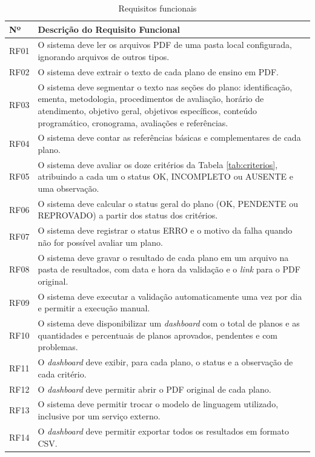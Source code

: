 \begin{table}[H]
\centering
\caption{Requisitos funcionais}
\label{tab:rf}
\footnotesize
\begin{tabular}{@{}L{1.1cm}L{13.3cm}@{}}
\toprule
{}
\textbf{Nº} & \textbf{Descrição do Requisito Funcional} \\ \midrule
RF01 & O sistema deve ler os arquivos PDF de uma pasta local configurada, ignorando arquivos de outros tipos. \\
RF02 & O sistema deve extrair o texto de cada plano de ensino em PDF. \\
RF03 & O sistema deve segmentar o texto nas seções do plano: identificação, ementa, metodologia, procedimentos de avaliação, horário de atendimento, objetivo geral, objetivos específicos, conteúdo programático, cronograma, avaliações e referências. \\
RF04 & O sistema deve contar as referências básicas e complementares de cada plano. \\
RF05 & O sistema deve avaliar os doze critérios da Tabela \ref{tab:criterios}, atribuindo a cada um o status OK, INCOMPLETO ou AUSENTE e uma observação. \\
RF06 & O sistema deve calcular o status geral do plano (OK, PENDENTE ou REPROVADO) a partir dos status dos critérios. \\
RF07 & O sistema deve registrar o status ERRO e o motivo da falha quando não for possível avaliar um plano. \\
RF08 & O sistema deve gravar o resultado de cada plano em um arquivo na pasta de resultados, com data e hora da validação e o \textit{link} para o PDF original. \\
RF09 & O sistema deve executar a validação automaticamente uma vez por dia e permitir a execução manual. \\
RF10 & O sistema deve disponibilizar um \textit{dashboard} com o total de planos e as quantidades e percentuais de planos aprovados, pendentes e com problemas. \\
RF11 & O \textit{dashboard} deve exibir, para cada plano, o status e a observação de cada critério. \\
RF12 & O \textit{dashboard} deve permitir abrir o PDF original de cada plano. \\
RF13 & O sistema deve permitir trocar o modelo de linguagem utilizado, inclusive por um serviço externo. \\
RF14 & O \textit{dashboard} deve permitir exportar todos os resultados em formato CSV. \\ \bottomrule
\end{tabular}
\end{table}

